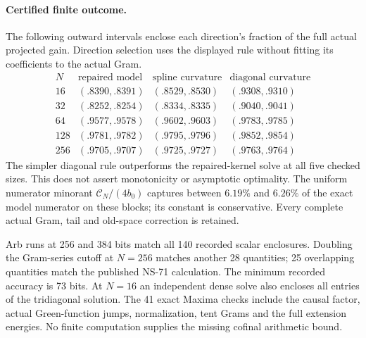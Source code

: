 \paragraph{Certified finite outcome.}
The following outward intervals enclose each direction's fraction of the
full actual projected gain. Direction selection uses the displayed rule
without fitting its coefficients to the actual Gram.
\[
\begin{array}{c|ccc}
 N&\text{repaired model}&\text{spline curvature}&\text{diagonal curvature}\\ \hline
16&(.8390,.8391)&(.8529,.8530)&(.9308,.9310)\\
32&(.8252,.8254)&(.8334,.8335)&(.9040,.9041)\\
64&(.9577,.9578)&(.9602,.9603)&(.9783,.9785)\\
128&(.9781,.9782)&(.9795,.9796)&(.9852,.9854)\\
256&(.9705,.9707)&(.9725,.9727)&(.9763,.9764)
\end{array}
\]
The simpler diagonal rule outperforms the repaired-kernel solve at all
five checked sizes. This does not assert monotonicity or asymptotic
optimality. The uniform numerator minorant $\mathcal C_N/(4b_0)$ captures
between $6.19\%$ and $6.26\%$ of the exact model numerator on these blocks;
its constant is conservative. Every complete actual Gram, tail and
old-space correction is retained.

Arb runs at 256 and 384 bits match all 140 recorded scalar enclosures.
Doubling the Gram-series cutoff at $N=256$ matches another 28 quantities;
25 overlapping quantities match the published NS-71 calculation.
The minimum recorded accuracy is 73 bits. At $N=16$ an independent
dense solve also encloses all entries of the tridiagonal solution.
The 41 exact Maxima checks include the causal factor, actual Green-function
jumps, normalization, tent Grams and the full extension energies.
No finite computation supplies the missing cofinal arithmetic bound.
